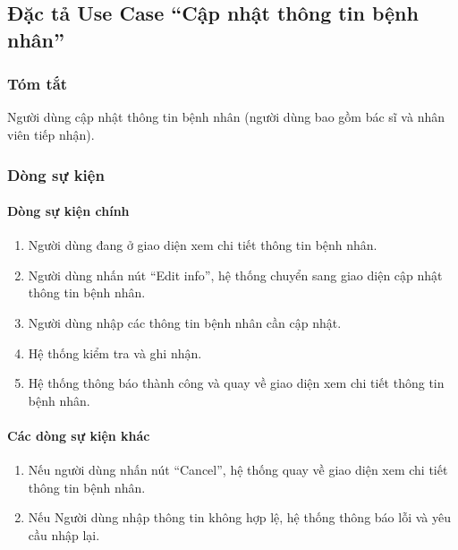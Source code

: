 \subsection{Đặc tả Use Case ``Cập nhật thông tin bệnh nhân''}

\subsubsection{Tóm tắt}
Người dùng cập nhật thông tin bệnh nhân (người dùng bao gồm bác sĩ và nhân viên tiếp nhận).

\subsubsection{Dòng sự kiện}
\paragraph{\textbf{Dòng sự kiện chính}}
\begin{enumerate}
  \item Người dùng đang ở giao diện xem chi tiết thông tin bệnh nhân.
  \item Người dùng nhấn nút ``Edit info'', hệ thống chuyển sang giao diện cập nhật thông tin bệnh nhân.
  \item Người dùng nhập các thông tin bệnh nhân cần cập nhật.
  \item Hệ thống kiểm tra và ghi nhận.
  \item Hệ thống thông báo thành công và quay về giao diện xem chi tiết thông tin bệnh nhân.
\end{enumerate}

\paragraph{\textbf{Các dòng sự kiện khác}}
\begin{enumerate}
  \item Nếu người dùng nhấn nút ``Cancel'', hệ thống quay về giao diện xem chi tiết thông tin bệnh nhân.
  \item Nếu Người dùng nhập thông tin không hợp lệ, hệ thống thông báo lỗi và yêu cầu nhập lại.
\end{enumerate}

